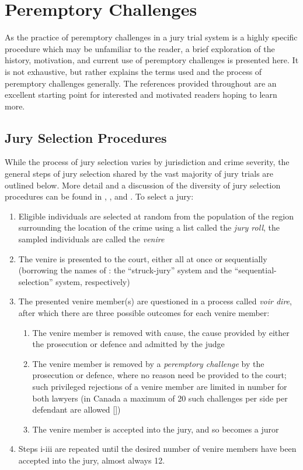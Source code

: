 \chapter{Peremptory Challenges} \label{c:background}

As the practice of peremptory challenges in a jury trial system is a highly specific procedure which may be unfamiliar to the
reader, a brief exploration of the history, motivation, and current use of peremptory challenges is presented here. It is not
exhaustive, but rather explains the terms used and the process of peremptory challenges generally. The references provided
throughout are an excellent starting point for interested and motivated readers hoping to learn more.

\section{Jury Selection Procedures} \label{sec:jurysel}

While the process of jury selection varies by jurisdiction and crime severity, the general steps of jury selection shared by the
vast majority of jury trials are outlined below. More detail and a discussion of the diversity of jury selection procedures can be
found in \cite{ford2010}, \cite{hansvidjudging}, and \cite{vandykejurysel}. To select a jury:

\begin{enumerate}
  \item Eligible individuals are selected at random from the population of the region surrounding the location of the crime using
    a list called the \textit{jury roll}, the sampled individuals are called the \textit{venire}
  \item The venire is presented to the court, either all at once or sequentially (borrowing the names of \cite{ford2010}: the
    ``struck-jury'' system and the ``sequential-selection'' system, respectively)
  \item The presented venire member(s) are questioned in a process called \textit{voir dire}, after which there are three possible
    outcomes for each venire member:
    \begin{enumerate}
      \item The venire member is removed with cause, the cause provided by either the prosecution or defence and admitted by
        the judge
      \item The venire member is removed by a \textit{peremptory challenge} by the prosecution or defence, where no reason
        need be provided to the court; such privileged rejections of a venire member are limited in number for both lawyers (in
        Canada a maximum of 20 such challenges per side per defendant are allowed [\cite{perempchallaw}])
      \item The venire member is accepted into the jury, and so becomes a juror
    \end{enumerate}
  \item Steps i-iii are repeated until the desired number of venire members have been accepted into the jury, almost always 12.
\end{enumerate}


